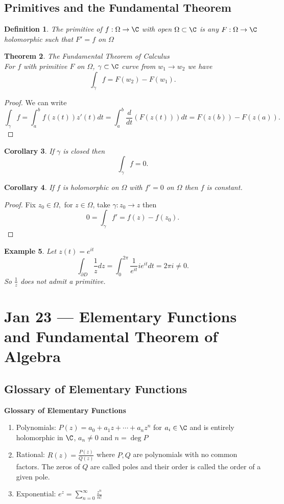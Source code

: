 \documentclass[a4paper]{article}
\newtheorem{thm}{Theorem}[section]
\newtheorem{defn}[thm]{Definition}
\newtheorem{eg}[thm]{Example}
\newtheorem{cor}[thm]{Corollary}
\begin{document}
\subsection{Primitives and the Fundamental Theorem}
\begin{defn}
    The primitive of $f:\Omega\to \C$ with open $\Omega\subset \C$ is any $F:\Omega\to \C$ holomorphic such that $F'=f$ on $\Omega$
\end{defn}
\begin{thm}
    The Fundamental Theorem of Calculus\\
    For $f$ with primitive $F$ on $\Omega$, $\gamma\subset \C$ curve from $w_1\to w_2$ we have \[
    \int_\gamma f=F(w_2)-F(w_1)
    .\] 
\end{thm}
\begin{proof}
    We can write \[
    \int_\gamma f=\int_a^bf(z(t))z'(t)dt=\int_a^b \frac{d}{dt}(F(z(t)))dt=F(z(b))-F(z(a))
    .\] 
\end{proof}
\begin{cor}
    If $\gamma$ is closed then \[
    \int_\gamma f=0
    .\] 
\end{cor}
\begin{cor}
    If $f$ is holomorphic on $\Omega$ with $f'=0$ on $\Omega$ then $f$ is constant.
\end{cor}
\begin{proof}
    Fix $z_0\in \Omega,$ for $z\in \Omega$, take $\gamma:z_0\to z$ then \[
    0=\int_\gamma f'=f(z)-f(z_0)
    .\] 
\end{proof}
\begin{eg}
    Let $z(t)=e^{it}$
    \[
    \int_{\partial D}{ \frac{1}{z}}dz=\int_0^{2\pi}\frac{1}{e^{it}}ie^{it}dt=2\pi i \neq 0
    .\] 
    So $\frac{1}{z}$ does not admit a primitive. 
\end{eg}
\newpage
\section{Jan 23 --- Elementary Functions and Fundamental Theorem of Algebra}
\subsection{Glossary of Elementary Functions}
\textbf{Glossary of Elementary Functions}
\begin{enumerate}
    \item Polynomials: $P(z)=a_0+a_1z+\cdots+a_nz^n$ for $a_i\in \C$ and is entirely holomorphic in $\C$, $a_n\neq 0 $ and $n=\deg P$
    \item Rational: $R(z)=\frac{P(z)}{Q(z)}$ where $P,Q$ are polynomials with no common factors. The zeros of $Q$ are called poles and their order is called the order of a given pole.
    \item Exponential: $e^z=\sum_{n=0}^\infty \frac{z^n}{n!}$
\end{enumerate}
\end{document}

